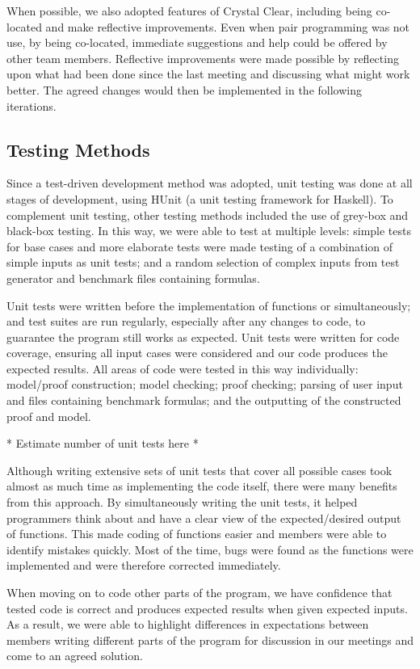 When possible, we also adopted features of Crystal Clear, including being co-located and make reflective improvements. Even when pair programming was not use, by being co-located, immediate suggestions and help could be offered by other team members. Reflective improvements were made possible by reflecting upon what had been done since the last meeting and discussing what might work better. The agreed changes would then be implemented in the following iterations.

\subsection*{Testing Methods}

Since a test-driven development method was adopted, unit testing was done at all stages of development, using HUnit (a unit testing framework for Haskell). To complement unit testing, other testing methods included the use of grey-box and black-box testing. In this way, we were able to test at multiple levels: simple tests for base cases and more elaborate tests were made testing of a combination of simple inputs as unit tests; and a random selection of complex inputs from test generator and benchmark files containing formulas.

Unit tests were written before the implementation of functions or simultaneously; and test suites are run regularly, especially after any changes to code, to guarantee the program still works as expected. Unit tests were written for code coverage, ensuring all input cases were considered and our code produces the expected results. All areas of code were tested in this way individually: model/proof construction; model checking; proof checking; parsing of user input and files containing benchmark formulas; and the outputting of the constructed proof and model.

* Estimate number of unit tests here *

Although writing extensive sets of unit tests that cover all possible cases took almost as much time as implementing the code itself, there were many benefits from this approach. By simultaneously writing the unit tests, it helped programmers think about and have a clear view of the expected/desired output of functions. This made coding of functions easier and members were able to identify mistakes quickly. Most of the time, bugs were found as the functions were implemented and were therefore corrected immediately.

When moving on to code other parts of the program, we have confidence that tested code is correct and produces expected results when given expected inputs. As a result, we were able to highlight differences in expectations between members writing different parts of the program for discussion in our meetings and come to an agreed solution.

